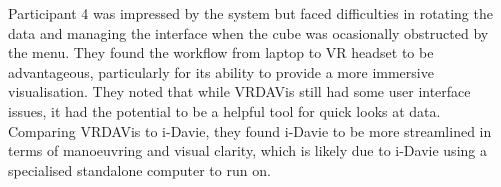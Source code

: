 





Participant 4 was impressed by the system but faced difficulties in rotating the data and managing the interface when the cube was ocasionally obstructed by the menu. 
They found the workflow from laptop to VR headset to be advantageous, particularly for its ability to provide a more immersive visualisation. 
They noted that while VRDAVis still had some user interface issues, it had the potential to be a helpful tool for quick looks at data. 
Comparing VRDAVis to i-Davie, they found i-Davie to be more streamlined in terms of manoeuvring and visual clarity, which is likely due to i-Davie using a specialised standalone computer to run on.

